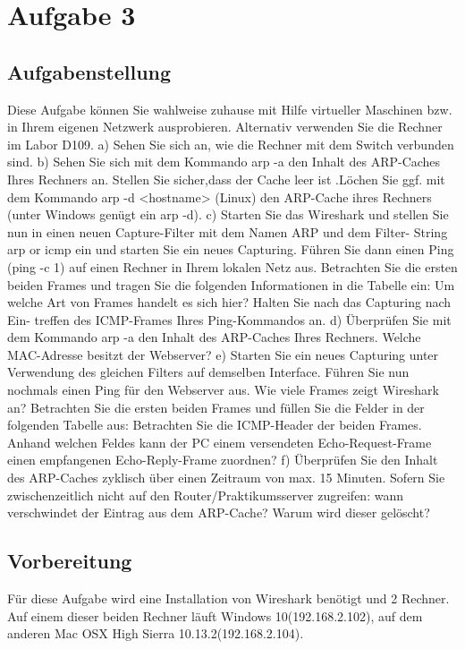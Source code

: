\section{Aufgabe 3}

\subsection{Aufgabenstellung}
Diese Aufgabe können Sie wahlweise zuhause mit Hilfe virtueller Maschinen bzw. in Ihrem eigenen Netzwerk ausprobieren. Alternativ verwenden Sie die Rechner im Labor D109.
a) Sehen Sie sich an, wie die Rechner mit dem Switch verbunden sind.
b) Sehen Sie sich mit dem Kommando arp -a den Inhalt des ARP-Caches Ihres Rechners an. Stellen Sie sicher,dass der Cache leer ist .Löchen Sie ggf. mit dem Kommando arp -d <hostname> (Linux) den ARP-Cache ihres Rechners (unter Windows genügt ein arp -d).
c) Starten Sie das Wireshark und stellen Sie nun in einen neuen Capture-Filter mit dem Namen ARP und dem Filter- String arp or icmp ein und starten Sie ein neues Capturing. Führen Sie dann einen Ping (ping -c 1) auf einen Rechner in Ihrem lokalen Netz aus. Betrachten Sie die ersten beiden Frames und tragen Sie die folgenden Informationen in die Tabelle ein:
Um welche Art von Frames handelt es sich hier? Halten Sie nach das Capturing nach Ein- treffen des ICMP-Frames Ihres Ping-Kommandos an.
d) Überprüfen Sie mit dem Kommando arp -a den Inhalt des ARP-Caches Ihres Rechners. Welche MAC-Adresse besitzt der Webserver?
e) Starten Sie ein neues Capturing unter Verwendung des gleichen Filters auf demselben Interface. Führen Sie nun nochmals einen Ping für den Webserver aus. Wie viele Frames zeigt Wireshark an?
Betrachten Sie die ersten beiden Frames und füllen Sie die Felder in der folgenden Tabelle aus:
Betrachten Sie die ICMP-Header der beiden Frames. Anhand welchen Feldes kann der PC einem versendeten Echo-Request-Frame einen empfangenen Echo-Reply-Frame zuordnen?
f) Überprüfen Sie den Inhalt des ARP-Caches zyklisch über einen Zeitraum von max. 15 Minuten. Sofern Sie zwischenzeitlich nicht auf den Router/Praktikumsserver zugreifen: wann verschwindet der Eintrag aus dem ARP-Cache? Warum wird dieser gelöscht?

\subsection{Vorbereitung}
Für diese Aufgabe wird eine Installation von Wireshark benötigt und 2 Rechner. Auf einem dieser beiden Rechner läuft Windows 10(192.168.2.102), auf dem anderen Mac OSX High Sierra 10.13.2(192.168.2.104).

